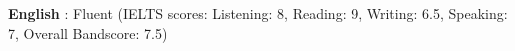 \begin{cventries}
    \skillentry
    {
    \bullet \space \textbf{English} : Fluent (IELTS scores:\hspace{5 mm} Listening: 8,\hspace{5 mm} Reading: 9,\hspace{5 mm} Writing: 6.5,\hspace{5 mm} Speaking: 7,\hspace{5 mm} Overall Bandscore: 7.5) 
    }
\end{cventries}